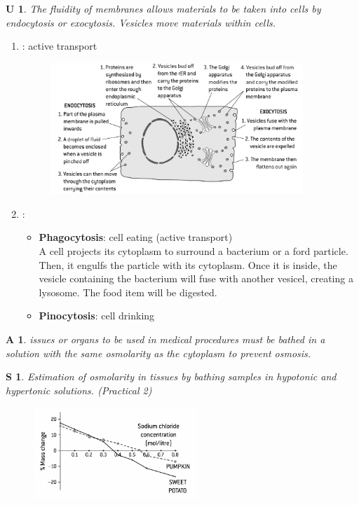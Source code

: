 \documentclass[12pt, a4paper]{article}
\newtheorem{und}{U}[subsection]
\newtheorem{skl}{S}[subsection]
\newtheorem{app}{A}[subsection]
\begin{document}
\begin{und}
    The fluidity of membranes allows materials to be taken into cells by endocytosis or exocytosis. Vesicles move materials within cells. 
\end{und}
\begin{enumerate}
    \item \textbf{\color{red}{Exocytosis}}: active transport
    \begin{figure}[H]
        \center
        \includegraphics[width=0.9\textwidth]{Fig1.15.png}
    \end{figure}
    \item \textbf{\color{red}{Endocytosis}}: 
    \begin{itemize}
        \item \textbf{Phagocytosis}: cell eating (active transport)\\ A cell projects its cytoplasm to surround a bacterium or a ford particle. Then, it engulfs the particle with its cytoplasm. Once it is inside, the vesicle containing the bacterium will fuse with another vesicel, creating a lysosome. The food item will be digested.
        \item \textbf{Pinocytosis}: cell drinking 
    \end{itemize}
\end{enumerate}
\begin{app}
    issues or organs to be used in medical procedures must be bathed in a solution with the same osmolarity as the cytoplasm to prevent osmosis.
\end{app}
\begin{skl}
    Estimation of osmolarity in tissues by bathing samples in hypotonic and hypertonic solutions. (Practical 2)
\end{skl}
\begin{figure}[H]
    \center
    \includegraphics[width=0.55\textwidth]{Fig1.16.png}
\end{figure}
\end{document}
